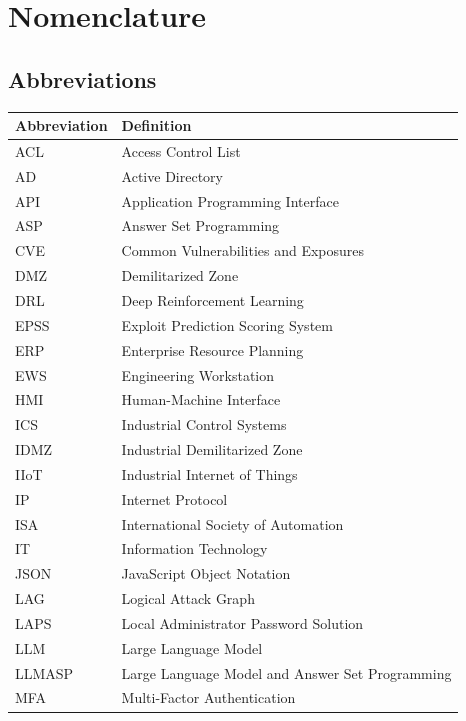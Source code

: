 \documentclass[target=mst,aauheader=aics,style=]{thud}
\begin{document}
\tableofcontents

\chapter*{Nomenclature}

\section*{Abbreviations}
\begin{longtable}{p{3.0cm}p{10.0cm}}
    \toprule
    \textbf{Abbreviation} & \textbf{Definition} \\
    \midrule
    \endhead
    ACL & Access Control List \\
    AD & Active Directory \\
    API & Application Programming Interface \\
    ASP & Answer Set Programming \\
    CVE & Common Vulnerabilities and Exposures \\
    DMZ & Demilitarized Zone \\
    DRL & Deep Reinforcement Learning \\
    EPSS & Exploit Prediction Scoring System \\
    ERP & Enterprise Resource Planning \\
    EWS & Engineering Workstation \\
    HMI & Human-Machine Interface \\
    ICS & Industrial Control Systems \\
    IDMZ & Industrial Demilitarized Zone \\
    IIoT & Industrial Internet of Things \\
    IP & Internet Protocol \\
    ISA & International Society of Automation \\
    IT & Information Technology \\
    JSON & JavaScript Object Notation \\
    LAG & Logical Attack Graph \\
    LAPS & Local Administrator Password Solution \\
    LLM & Large Language Model \\
    LLMASP & Large Language Model and Answer Set Programming \\
    MFA & Multi-Factor Authentication \\

\end{longtable}
\end{document}
